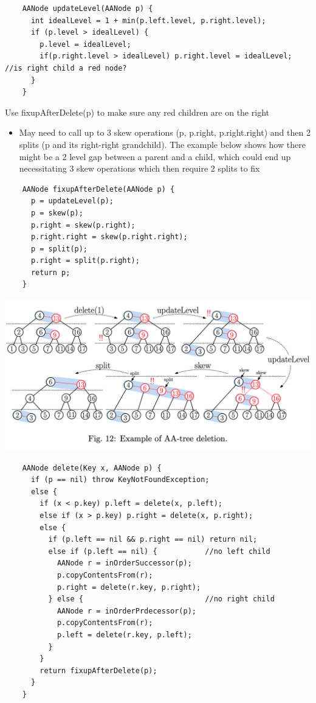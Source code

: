 \documentclass{article}
\begin{document}
  \begin{lstlisting}
    AANode updateLevel(AANode p) {
      int idealLevel = 1 + min(p.left.level, p.right.level);
      if (p.level > idealLevel) {
        p.level = idealLevel;
        if(p.right.level > idealLevel) p.right.level = idealLevel;  //is right child a red node?
      }
    } 
  \end{lstlisting}
  Use fixupAfterDelete(p) to make sure any red children are on the right
  \begin{itemize}[noitemsep]
  \item May need to call up to 3 skew operations (p, p.right, p.right.right) and then 2 splits (p and its right-right grandchild). The example below shows how there might be a 2 level gap between a parent and a child, which could end up necessitating 3 skew operations which then require 2 splits to fix
  \end{itemize}
  \begin{lstlisting}
    AANode fixupAfterDelete(AANode p) {
      p = updateLevel(p);
      p = skew(p);
      p.right = skew(p.right);
      p.right.right = skew(p.right.right);
      p = split(p);
      p.right = split(p.right);
      return p;
    }
  \end{lstlisting}
  \includegraphics[width=\textwidth]{DeletionAATree}
  \newpage
  \begin{lstlisting}
    AANode delete(Key x, AANode p) {
      if (p == nil) throw KeyNotFoundException;
      else {
        if (x < p.key) p.left = delete(x, p.left);
        else if (x > p.key) p.right = delete(x, p.right);
        else {
          if (p.left == nil && p.right == nil) return nil;
          else if (p.left == nil) {           //no left child
            AANode r = inOrderSuccessor(p);
            p.copyContentsFrom(r);
            p.right = delete(r.key, p.right);
          } else {                            //no right child
            AANode r = inOrderPrdecessor(p);
            p.copyContentsFrom(r);
            p.left = delete(r.key, p.left);
          }
        }
        return fixupAfterDelete(p);
      }
    }
  \end{lstlisting}
  \newpage
\end{document}
